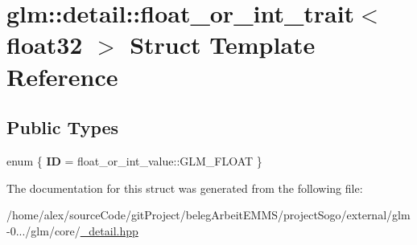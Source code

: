\hypertarget{structglm_1_1detail_1_1float__or__int__trait_3_01float32_01_4}{\section{glm\-:\-:detail\-:\-:float\-\_\-or\-\_\-int\-\_\-trait$<$ float32 $>$ Struct Template Reference}
\label{structglm_1_1detail_1_1float__or__int__trait_3_01float32_01_4}
}
\subsection*{Public Types}
\begin{DoxyCompactItemize}
\item 
enum \{ {\bfseries I\-D} = float\-\_\-or\-\_\-int\-\_\-value\-:\-:G\-L\-M\-\_\-\-F\-L\-O\-A\-T
 \}
\end{DoxyCompactItemize}


The documentation for this struct was generated from the following file\-:\begin{DoxyCompactItemize}
\item 
/home/alex/source\-Code/git\-Project/beleg\-Arbeit\-E\-M\-M\-S/project\-Sogo/external/glm-\/0.../glm/core/\hyperlink{__detail_8hpp}{\-\_\-detail.\-hpp}\end{DoxyCompactItemize}
